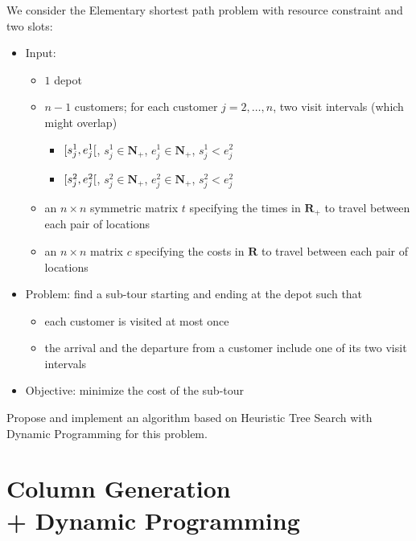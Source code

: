 \documentclass[a4paper,twocolumn]{article}
\newcommand{\N}{\mathbf{N}}
\newcommand{\R}{\mathbf{R}}
\begin{document}
We consider the Elementary shortest path problem with resource constraint and two slots:
\begin{itemize}
  \item Input:
    \begin{itemize}
      \item $1$ depot
      \item $n - 1$ customers; for each customer $j = 2, \dots, n$, two visit intervals (which might overlap)
        \begin{itemize}
          \item $\interval[open right]{s_j^1}{e_j^1}$, $s_j^1 \in \N_+$, $e_j^1 \in \N_+$, $s_j^1 < e_j^2$
          \item $\interval[open right]{s_j^2}{e_j^2}$, $s_j^2 \in \N_+$, $e_j^2 \in \N_+$, $s_j^2 < e_j^2$
        \end{itemize}
      \item an $n \times n$ symmetric matrix $t$ specifying the times in $\R_+$ to travel between each pair of locations
      \item an $n \times n$ matrix $c$ specifying the costs in $\R$ to travel between each pair of locations
    \end{itemize}
  \item Problem: find a sub-tour starting and ending at the depot such that
    \begin{itemize}
      \item each customer is visited at most once
      \item the arrival and the departure from a customer include one of its two visit intervals
    \end{itemize}
  \item Objective: minimize the cost of the sub-tour
\end{itemize}

Propose and implement an algorithm based on Heuristic Tree Search with Dynamic Programming for this problem.

\section{Column Generation \\ + Dynamic Programming}
\end{document}
